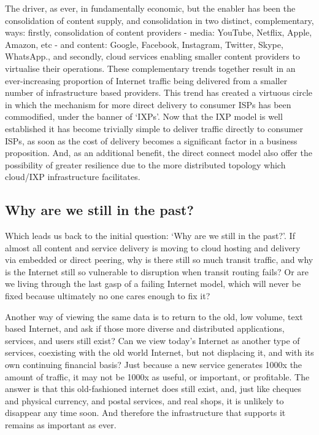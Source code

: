 The driver, as ever, in fundamentally economic, but the enabler has been the consolidation of content supply, and consolidation in two distinct, complementary, ways: firstly, consolidation of content providers - media: YouTube, Netflix, Apple, Amazon, etc - and content: Google, Facebook, Instagram, Twitter, Skype, WhatsApp., and secondly, cloud services enabling smaller content providers to virtualise their operations.
These complementary trends together result in an ever-increasing proportion of Internet traffic being delivered from a smaller number of infrastructure based providers.
This trend has created a virtuous circle in which the mechanism for more direct delivery to consumer ISPs has been commodified, under the banner of ‘IXPs’.
Now that the IXP model is well established it has become trivially simple to deliver traffic directly to consumer ISPs, as soon as the cost of delivery becomes a significant factor in a business proposition.
And, as an additional benefit, the direct connect model also offer the possibility of greater resilience due to the more distributed topology which cloud/IXP infrastructure facilitates.

\subsection{Why are we still in the past?}

Which leads us back to the initial question: ‘Why are we still in the past?’.
If almost all content and service delivery is moving to cloud hosting and delivery via embedded or direct peering, why is there still so much transit traffic, and why is the Internet still so vulnerable to disruption when transit routing fails?
Or are we living through the last gasp of a failing Internet model, which will never be fixed because ultimately no one cares enough to fix it?

Another way of viewing the same data is to return to the old, low volume, text based Internet, and ask if those more diverse and distributed applications, services, and users still exist?
Can we view today's Internet as another type of services, coexisting with the old world Internet, but not displacing it, and with its own continuing financial basis?
Just because a new service generates 1000x the amount of traffic, it may not be 1000x as useful, or important, or profitable.
The answer is that this old-fashioned internet does still exist, and, just like cheques and physical currency, and postal services, and real shops, it is unlikely to disappear any time soon.
And therefore the infrastructure that supports it remains as important as ever.

